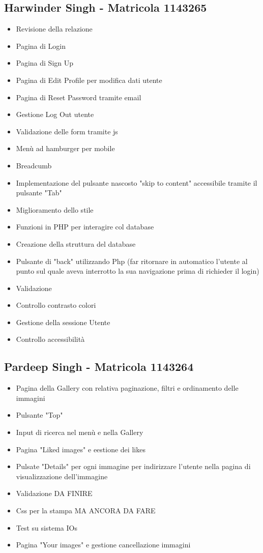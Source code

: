 \documentclass[openany, a4paper, 12pt]{report}
\begin{document}
	\subsection{Harwinder Singh - Matricola 1143265}
	\begin{itemize}
		\item Revisione della relazione
		\item Pagina di Login
		\item Pagina di Sign Up
		\item Pagina di Edit Profile per modifica dati utente
		\item Pagina di Reset Password tramite email
		\item Gestione Log Out utente
		\item Validazione delle form tramite js
		\item Menù ad hamburger per mobile
		\item Breadcumb
		\item Implementazione del pulsante nascosto "skip to content" accessibile tramite il pulsante "Tab" 
		\item Miglioramento dello stile
		\item Funzioni in PHP per interagire col database
		\item Creazione della struttura del database
		\item Pulsante di "back" utilizzando Php (far ritornare in automatico l'utente al punto sul quale aveva interrotto la sua navigazione prima di richieder il login)
		\item Validazione 
		\item Controllo contrasto colori
		\item Gestione della sessione Utente
		\item Controllo accessibilità
	\end{itemize}
	\subsection{Pardeep Singh - Matricola 1143264}
	\begin{itemize}
		\item Pagina della Gallery con relativa paginazione, filtri e ordinamento delle immagini
		\item Pulsante "Top"
		\item Input di ricerca nel menù e nella Gallery
		\item Pagina "Liked images" e eestione dei likes
		\item Pulsate "Details" per ogni immagine per indirizzare l'utente nella pagina di visualizzazione dell'immagine 
		\item Validazione DA FINIRE
		\item Css per la stampa MA ANCORA DA FARE
		\item Test su sistema IOs
		\item Pagina "Your images" e gestione cancellazione immagini
	\end{itemize}
\end{document}
